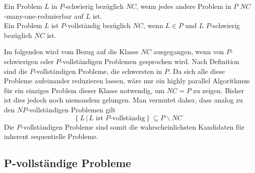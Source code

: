 \begin{define}
    Ein Problem $L$ in $P$-schwierig bezüglich $NC$, wenn jedes andere Problem
    in $P$ $NC$-many-one-reduzierbar auf $L$ ist. \\
    Ein Problem $L$ ist $P$-vollständig bezüglich $NC$, wenn $L \in P$ und $L$
    $P$-schwierig bezüglich $NC$ ist.
\end{define}
Im folgenden wird vom Bezug auf die Klasse $NC$ ausgegangen, wenn von
$P$-schwierigen oder $P$-vollständigen Problemen gesprochen wird.
%
Nach Definition sind die $P$-vollständigen Probleme, die schwersten in $P$.
Da sich alle diese Probleme aufeinander reduzieren lassen, wäre nur ein highly
parallel Algorithmus für ein einziges Problem dieser Klasse notwendig, um
$NC = P$ zu zeigen.
Bisher ist dies jedoch noch niemandem gelungen.
Man vermutet daher, dass analog zu den $NP$-vollständigen Problemen gilt
\begin{equation}
    \left\{ L \, | \, L \text{ ist $P$-vollständig} \right\} \subseteq P \backslash NC
\end{equation}
Die $P$-vollständigen Probleme sind somit die wahrscheinlichsten Kandidaten
für inherent sequentielle Probleme.
\cite[S.54ff]{greenlaw}\cite[S.535]{jaja}

\subsection{P-vollständige Probleme}
